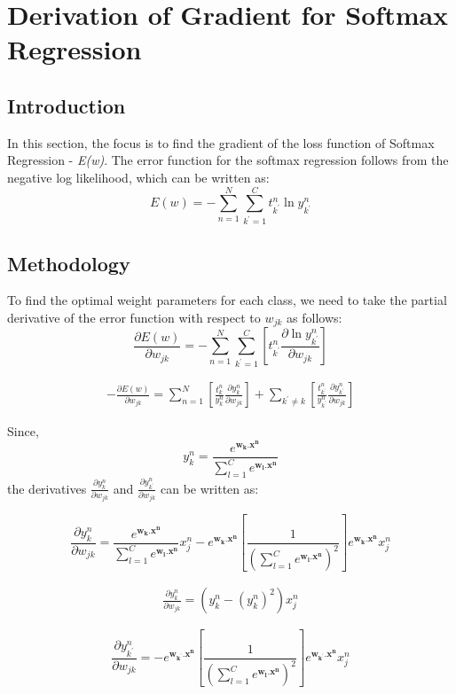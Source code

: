 \documentclass{article}
\begin{document}
\newpage
\section{Derivation of Gradient for Softmax Regression}

\subsection{Introduction}
In this section, the focus is to find the gradient of the loss function of Softmax Regression - \emph{E(w)}. The error function for the softmax regression follows from the negative log likelihood, which can be written as:
$$E(w) = - \sum_{n=1}^{N} \sum_{k^{'}=1}^{C} t_{k^{'}}^{n} \ln y_{k^{'}}^{n}$$

\subsection{Methodology}
To find the optimal weight parameters for each class, we need to take the partial derivative of the error function with respect to $w_{jk}$ as follows:
$$\frac{\partial E(w)}{\partial w_{jk}} = - \sum_{n=1}^{N} \sum_{k^{'}=1}^{C} \left[ t_{k^{'}}^{n} \frac{\partial \ln y_{k^{'}}^{n}}{\partial w_{jk}} \right]$$

\begin{align}
- \frac{\partial E(w)}{\partial w_{jk}} = \sum_{n=1}^{N} \left[ \frac{t_{k}^{n}}{y_{k}^{n}} \frac{\partial y_{k}^{n}}{\partial w_{jk}}\right] + \sum_{k^{'}\neq k} \left[ \frac{t_{k^{'}}^{n}}{y_{k^{'}}^{n}} \frac{\partial y_{k^{'}}^{n}}{\partial w_{jk}} \right]
\end{align}

Since, $$y_{k}^{n} = \frac{e^{\mathbf{w_{k}.x^{n}}}}{\sum_{l=1}^{C} e^{\mathbf{w_{l}.x^{n}}}}$$ the derivatives $\frac{\partial y_{k}^{n}}{\partial w_{jk}}$ and $\frac{\partial y_{k^{'}}^{n}}{\partial w_{jk}}$ can be written as:

$$\frac{\partial y_{k}^{n}}{\partial w_{jk}} = \frac{e^{\mathbf{w_{k}.x^{n}}}}{\sum_{l=1}^{C} e^{\mathbf{w_{l}.x^{n}}}} x^{n}_{j} - e^{\mathbf{w_{k}.x^{n}}} \left[ \frac{1}{(\sum_{l=1}^{C} e^{\mathbf{w_{l}.x^{n}}})^{2}} \right] e^{\mathbf{w_{k}.x^{n}}} x^{n}_{j}$$

\begin{align}
\frac{\partial y_{k}^{n}}{\partial w_{jk}} = \left(y_{k}^{n} - (y_{k}^{n})^{2}\right) x^{n}_{j}
\end{align}

$$\frac{\partial y_{k^{'}}^{n}}{\partial w_{jk}} = - e^{\mathbf{w_{k^{'}}.x^{n}}} \left[ \frac{1}{(\sum_{l=1}^{C} e^{\mathbf{w_{l}.x^{n}}})^{2}} \right] e^{\mathbf{w_{k^{'}}.x^{n}}} x^{n}_{j}$$
\end{document}
